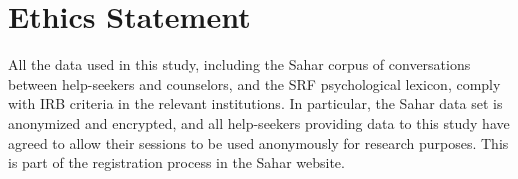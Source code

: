 \documentclass[letterpaper]{article} %
\newcommand{\kibitz}[2]{\ifnum\Comments=1{\textcolor{#1}{#2}}\fi}
\newcommand{\di}[1]{\kibitz{blue}{[DI:#1]}}
\begin{document}




\section{Ethics Statement}
All the data used in this study, including the Sahar corpus of conversations between help-seekers and counselors, and the SRF psychological lexicon, comply with  IRB criteria in the relevant institutions. In particular, the  Sahar data set is anonymized and encrypted, and all help-seekers providing data to this study have agreed to allow their sessions to be used anonymously for research purposes. This is part of the registration process in the Sahar website.
\end{document}
